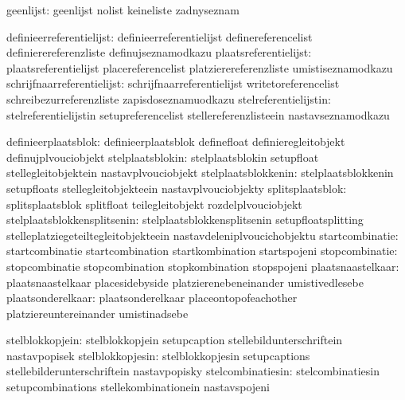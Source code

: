                     geenlijst:  geenlijst                    nolist
                                keineliste                   zadnyseznam


     definieerreferentielijst:  definieerreferentielijst     definereferencelist
                                definierereferenzliste       definujseznamodkazu
        plaatsreferentielijst:  plaatsreferentielijst        placereferencelist
                                platzierereferenzliste       umistiseznamodkazu
   schrijfnaarreferentielijst:  schrijfnaarreferentielijst   writetoreferencelist
                                schreibezurreferenzliste     zapisdoseznamuodkazu
        stelreferentielijstin:  stelreferentielijstin        setupreferencelist
                                stellereferenzlisteein       nastavseznamodkazu

          definieerplaatsblok:  definieerplaatsblok          definefloat
                                definieregleitobjekt         definujplvouciobjekt
             stelplaatsblokin:  stelplaatsblokin             setupfloat
                                stellegleitobjektein         nastavplvouciobjekt
          stelplaatsblokkenin:  stelplaatsblokkenin          setupfloats
                                stellegleitobjekteein        nastavplvouciobjekty
             splitsplaatsblok:  splitsplaatsblok             splitfloat
                                teilegleitobjekt             rozdelplvouciobjekt
  stelplaatsblokkensplitsenin:  stelplaatsblokkensplitsenin  setupfloatsplitting
                                stelleplatziegeteiltegleitobjekteein nastavdeleniplvoucichobjektu
              startcombinatie:  startcombinatie              startcombination
                                startkombination             startspojeni
               stopcombinatie:  stopcombinatie               stopcombination
                                stopkombination              stopspojeni
            plaatsnaastelkaar:  plaatsnaastelkaar            placesidebyside
                                platzierenebeneinander       umistivedlesebe
            plaatsonderelkaar:  plaatsonderelkaar            placeontopofeachother
                                platziereuntereinander       umistinadsebe

              stelblokkopjein:  stelblokkopjein              setupcaption
                                stellebildunterschriftein    nastavpopisek
             stelblokkopjesin:  stelblokkopjesin             setupcaptions
                                stellebilderunterschriftein  nastavpopisky
            stelcombinatiesin:  stelcombinatiesin            setupcombinations
                                stellekombinationein         nastavspojeni

